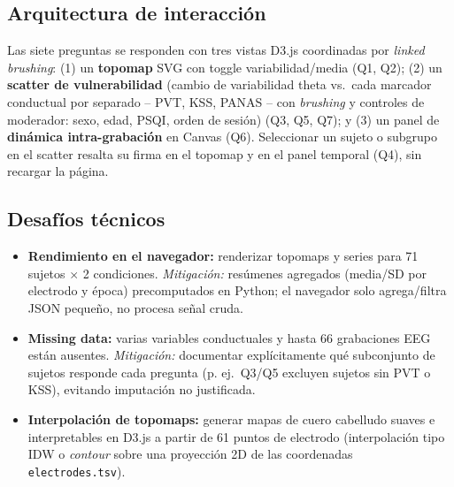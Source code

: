 \documentclass[10pt]{article}
\begin{document}
\subsection*{Arquitectura de interacción}
Las siete preguntas se responden con tres vistas D3.js coordinadas por \emph{linked brushing}: (1) un \textbf{topomap} SVG con toggle variabilidad/media (Q1, Q2); (2) un \textbf{scatter de vulnerabilidad} (cambio de variabilidad theta vs.\ cada marcador conductual por separado -- PVT, KSS, PANAS -- con \emph{brushing} y controles de moderador: sexo, edad, PSQI, orden de sesión) (Q3, Q5, Q7); y (3) un panel de \textbf{dinámica intra-grabación} en Canvas (Q6). Seleccionar un sujeto o subgrupo en el scatter resalta su firma en el topomap y en el panel temporal (Q4), sin recargar la página.

\subsection*{Desafíos técnicos}
\begin{itemize}
    \item \textbf{Rendimiento en el navegador:} renderizar topomaps y series para 71 sujetos $\times$ 2 condiciones. \emph{Mitigación:} resúmenes agregados (media/SD por electrodo y época) precomputados en Python; el navegador solo agrega/filtra JSON pequeño, no procesa señal cruda.
    \item \textbf{Missing data:} varias variables conductuales y hasta 66 grabaciones EEG están ausentes. \emph{Mitigación:} documentar explícitamente qué subconjunto de sujetos responde cada pregunta (p. ej.\ Q3/Q5 excluyen sujetos sin PVT o KSS), evitando imputación no justificada.
    \item \textbf{Interpolación de topomaps:} generar mapas de cuero cabelludo suaves e interpretables en D3.js a partir de 61 puntos de electrodo (interpolación tipo IDW o \emph{contour} sobre una proyección 2D de las coordenadas \texttt{electrodes.tsv}).
\end{itemize}
\end{document}
